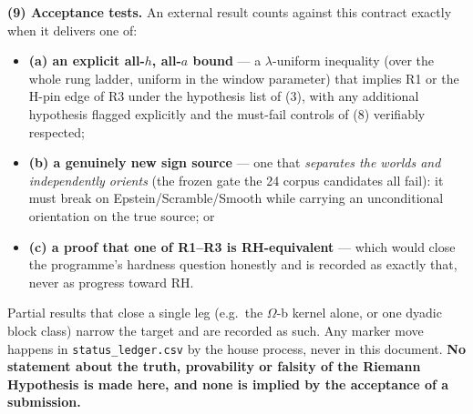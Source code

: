 \documentclass[11pt,a4paper]{article}
\begin{document}
\par\smallskip\noindent\textbf{(9) Acceptance tests.}  An external result counts against this
contract exactly when it delivers one of:
\begin{itemize}
\item \textbf{(a) an explicit all-$h$, all-$a$ bound} --- a $\lambda$-uniform inequality (over
  the whole rung ladder, uniform in the window parameter) that implies R1 or the H-pin edge of
  R3 under the hypothesis list of (3), with any additional hypothesis flagged explicitly and
  the must-fail controls of (8) verifiably respected;
\item \textbf{(b) a genuinely new sign source} --- one that \emph{separates the worlds and
  independently orients} (the frozen gate the 24 corpus candidates all fail): it must break on
  Epstein/Scramble/Smooth while carrying an unconditional orientation on the true source; or
\item \textbf{(c) a proof that one of R1--R3 is RH-equivalent} --- which would close the
  programme's hardness question honestly and is recorded as exactly that, never as progress
  toward RH.
\end{itemize}
Partial results that close a single leg (e.g.\ the $\Omega$-b kernel alone, or one dyadic
block class) narrow the target and are recorded as such.  Any marker move happens in
\texttt{status\_ledger.csv} by the house process, never in this document.  \textbf{No
statement about the truth, provability or falsity of the Riemann Hypothesis is made here, and
none is implied by the acceptance of a submission.}

\end{document}
